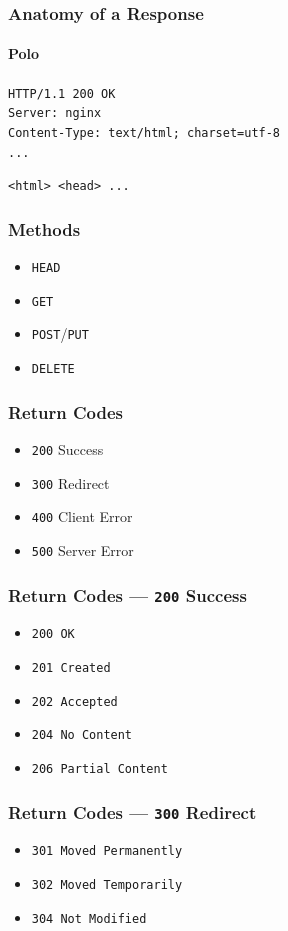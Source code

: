\documentclass{beamer}
\begin{document}
\begin{frame}
  \frametitle{Anatomy of a Response}
  \framesubtitle{Polo}

  \texttt{{\color{blue}HTTP/1.1} \color{orange}200 OK} \\
  {
    \color{olive}
    \texttt{Server: nginx} \\
    \texttt{Content-Type: text/html; charset=utf-8} \\
    \texttt{...} \\
  } \bigskip

  {
    \color{violet}
    \texttt{<html> <head> ...}
  }
\end{frame}


\begin{frame}
  \frametitle{Methods}
  \begin{itemize}
    \item \texttt{HEAD}
    \item \texttt{GET}
    \item \texttt{POST}/\texttt{PUT}
    \item \texttt{DELETE}
  \end{itemize}
\end{frame}


\begin{frame}
  \frametitle{Return Codes}
  \begin{itemize}
    \item \texttt{200} Success 
    \item \texttt{300} Redirect
    \item \texttt{400} Client Error
    \item \texttt{500} Server Error
  \end{itemize}
\end{frame}


\begin{frame}
  \frametitle{Return Codes --- \texttt{200} Success}
  \begin{itemize}
    \item \texttt{200 OK}
    \item \texttt{201 Created}
    \item \texttt{202 Accepted}
    \item \texttt{204 No Content}
    \item \texttt{206 Partial Content}
  \end{itemize}
\end{frame}


\begin{frame}
  \frametitle{Return Codes --- \texttt{300} Redirect}
  \begin{itemize}
    \item \texttt{301 Moved Permanently}
    \item \texttt{302 Moved Temporarily}
    \item \texttt{304 Not Modified}
  \end{itemize}
\end{frame}
\end{document}
